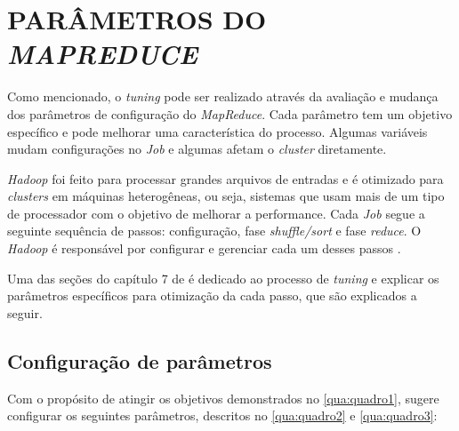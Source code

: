 \section{PARÂMETROS DO \textit{MAPREDUCE}} \label{sec:parametrosmapreduce}

Como mencionado, o \textit{tuning} pode ser realizado através da avaliação e mudança dos parâmetros de configuração do \textit{MapReduce}. Cada parâmetro tem um objetivo específico e pode melhorar uma característica do processo. Algumas variáveis mudam configurações no \textit{Job} e algumas afetam o \textit{cluster} diretamente.

\textit{Hadoop} foi feito para processar grandes arquivos de entradas e é otimizado para \textit{clusters} em máquinas heterogêneas, ou seja, sistemas que usam mais de um tipo de processador com o objetivo de melhorar a performance. Cada \textit{Job} segue a seguinte sequência de passos: configuração, fase \textit{shuffle/sort} e fase \textit{reduce}. O \textit{Hadoop} é responsável por configurar e gerenciar cada um desses passos \cite{ProHadoop09}.

Uma das seções do capítulo 7 de \textcite{HadoopBook15} é dedicado ao processo de \textit{tuning} e explicar os parâmetros específicos para otimização da cada passo, que são explicados a seguir.

\subsection{Configuração de parâmetros}\label{ssec:configuracaooparametros}

Com o propósito de atingir os objetivos demonstrados no \autoref{qua:quadro1}, \textcite{HadoopBook15} sugere configurar os seguintes parâmetros, descritos no \autoref{qua:quadro2} e \autoref{qua:quadro3}:

